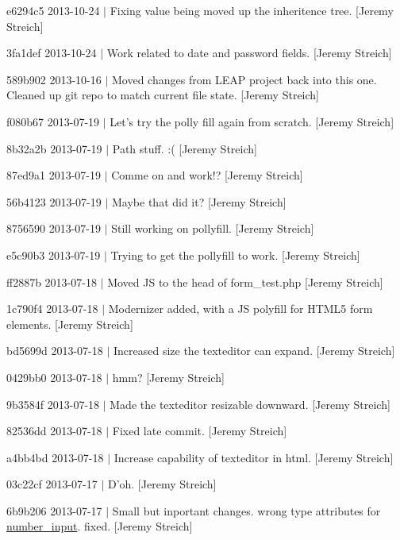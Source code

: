 \begin{DoxyItemize}
\item e6294c5 2013-\/10-\/24 $|$ Fixing value being moved up the inheritence tree. \mbox{[}Jeremy Streich\mbox{]}
\item 3fa1def 2013-\/10-\/24 $|$ Work related to date and password fields. \mbox{[}Jeremy Streich\mbox{]}
\item 589b902 2013-\/10-\/16 $|$ Moved changes from L\-E\-A\-P project back into this one. Cleaned up git repo to match current file state. \mbox{[}Jeremy Streich\mbox{]}
\item f080b67 2013-\/07-\/19 $|$ Let's try the polly fill again from scratch. \mbox{[}Jeremy Streich\mbox{]}
\item 8b32a2b 2013-\/07-\/19 $|$ Path stuff. \-:( \mbox{[}Jeremy Streich\mbox{]}
\item 87ed9a1 2013-\/07-\/19 $|$ Comme on and work!? \mbox{[}Jeremy Streich\mbox{]}
\item 56b4123 2013-\/07-\/19 $|$ Maybe that did it? \mbox{[}Jeremy Streich\mbox{]}
\item 8756590 2013-\/07-\/19 $|$ Still working on pollyfill. \mbox{[}Jeremy Streich\mbox{]}
\item e5c90b3 2013-\/07-\/19 $|$ Trying to get the pollyfill to work. \mbox{[}Jeremy Streich\mbox{]}
\item ff2887b 2013-\/07-\/18 $|$ Moved J\-S to the head of form\-\_\-test.\-php \mbox{[}Jeremy Streich\mbox{]}
\item 1c790f4 2013-\/07-\/18 $|$ Modernizer added, with a J\-S polyfill for H\-T\-M\-L5 form elements. \mbox{[}Jeremy Streich\mbox{]}
\item bd5699d 2013-\/07-\/18 $|$ Increased size the texteditor can expand. \mbox{[}Jeremy Streich\mbox{]}
\item 0429bb0 2013-\/07-\/18 $|$ hmm? \mbox{[}Jeremy Streich\mbox{]}
\item 9b3584f 2013-\/07-\/18 $|$ Made the texteditor resizable downward. \mbox{[}Jeremy Streich\mbox{]}
\item 82536dd 2013-\/07-\/18 $|$ Fixed late commit. \mbox{[}Jeremy Streich\mbox{]}
\item a4bb4bd 2013-\/07-\/18 $|$ Increase capability of texteditor in html. \mbox{[}Jeremy Streich\mbox{]}
\item 03c22cf 2013-\/07-\/17 $|$ D'oh. \mbox{[}Jeremy Streich\mbox{]}
\item 6b9b206 2013-\/07-\/17 $|$ Small but inportant changes. wrong type attributes for \hyperlink{classnumber__input}{number\-\_\-input}. fixed. \mbox{[}Jeremy Streich\mbox{]}

\end{DoxyItemize}
